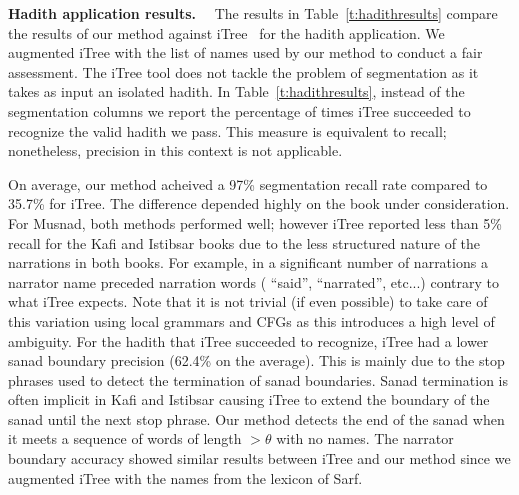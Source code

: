 \documentclass{llncs}
\newcommand{\noVocRL}[1]{\transtrue\novocalize\RL{#1}\vocalize}
\begin{document}
{\bf Hadith application results.}~~
The results in Table~\ref{t:hadithresults} compare the results of our method against iTree~\cite{iTree} for the hadith application.
We augmented iTree with the list of names used by our method to conduct a fair assessment.
The iTree tool does not tackle the problem of segmentation as it
takes as input an isolated hadith. 
In Table~\ref{t:hadithresults}, instead of the segmentation columns 
we report the percentage of times iTree succeeded to recognize the valid hadith we pass.
This measure is equivalent to recall; nonetheless, precision in this context is not applicable.

On average, our method acheived a 97\% segmentation recall rate compared to 35.7\% for iTree.
The difference depended highly on the book under consideration. 
For Musnad, both methods performed well;
however iTree reported less than 5\% recall for the Kafi and Istibsar books due
to the less structured nature of the narrations in both books.
For example, in a significant number of narrations a narrator name preceded narration words 
(\noVocRL{qAl} ``said'', \noVocRL{.hadda_t} ``narrated'', etc...) contrary to what iTree expects.
Note that it is not trivial (if even possible) to take care of this variation using local grammars 
and CFGs as this introduces a high level of ambiguity.
For the hadith that iTree succeeded to recognize, iTree had a lower sanad boundary precision (62.4\% on the average).
This is mainly due to the stop phrases used to detect the termination of sanad boundaries.
Sanad termination is often implicit in Kafi and Istibsar causing iTree to extend the boundary of the sanad until the next stop phrase.
Our method detects the end of the sanad when it meets a sequence of words of length $> \theta$ with no names.
The narrator boundary accuracy showed similar results between iTree and 
our method since we augmented iTree with the names from the lexicon of Sarf. 
\end{document}
